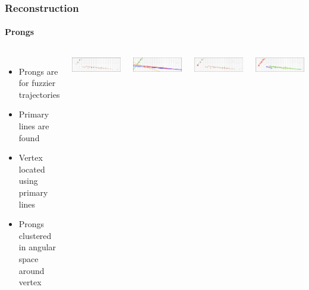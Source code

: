 \documentclass[10pt,professionalfonts,xcolor=table]{beamer}
\begin{document}
\begin{frame}

\frametitle{Reconstruction}
\framesubtitle{Prongs}
\begin{columns}[c]
  \begin{itemize}
  \item Prongs are for fuzzier trajectories
  \gap
  \item Primary lines are found
  \gap
  \item Vertex located using primary lines
  \gap
  \item Prongs clustered in angular space around vertex

  \end{itemize}

\centering

\includegraphics[width=\textwidth]{figures/evd_steps/slice.png}

\includegraphics[width=\textwidth]{figures/evd_steps/hough.png}

\includegraphics[width=\textwidth]{figures/evd_steps/vertex.png}

\includegraphics[width=\textwidth]{figures/evd_steps/prongs.png}

\end{columns}


\end{frame}
\end{document}
